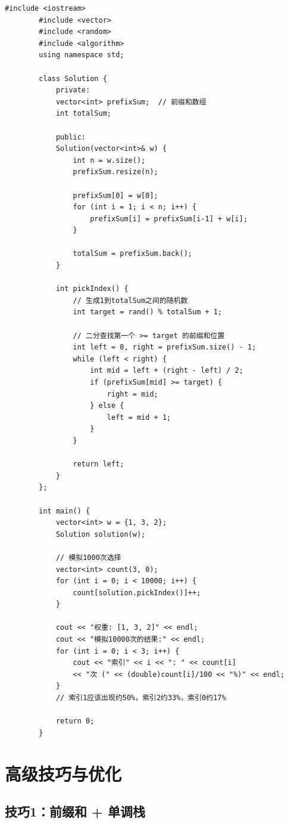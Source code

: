 \documentclass[12pt,a4paper]{article}
\begin{document}
	\begin{lstlisting}[caption={进阶题5：按权重随机选择 - 前缀和+二分}]
		#include <iostream>
		#include <vector>
		#include <random>
		#include <algorithm>
		using namespace std;
		
		class Solution {
			private:
			vector<int> prefixSum;  // 前缀和数组
			int totalSum;
			
			public:
			Solution(vector<int>& w) {
				int n = w.size();
				prefixSum.resize(n);
				
				prefixSum[0] = w[0];
				for (int i = 1; i < n; i++) {
					prefixSum[i] = prefixSum[i-1] + w[i];
				}
				
				totalSum = prefixSum.back();
			}
			
			int pickIndex() {
				// 生成1到totalSum之间的随机数
				int target = rand() % totalSum + 1;
				
				// 二分查找第一个 >= target 的前缀和位置
				int left = 0, right = prefixSum.size() - 1;
				while (left < right) {
					int mid = left + (right - left) / 2;
					if (prefixSum[mid] >= target) {
						right = mid;
					} else {
						left = mid + 1;
					}
				}
				
				return left;
			}
		};
		
		int main() {
			vector<int> w = {1, 3, 2};
			Solution solution(w);
			
			// 模拟1000次选择
			vector<int> count(3, 0);
			for (int i = 0; i < 10000; i++) {
				count[solution.pickIndex()]++;
			}
			
			cout << "权重: [1, 3, 2]" << endl;
			cout << "模拟10000次的结果:" << endl;
			for (int i = 0; i < 3; i++) {
				cout << "索引" << i << ": " << count[i] 
				<< "次 (" << (double)count[i]/100 << "%)" << endl;
			}
			// 索引1应该出现约50%，索引2约33%，索引0约17%
			
			return 0;
		}
	\end{lstlisting}
	
	\section{高级技巧与优化}
	
	\subsection{技巧1：前缀和 + 单调栈}
	
\end{document}
